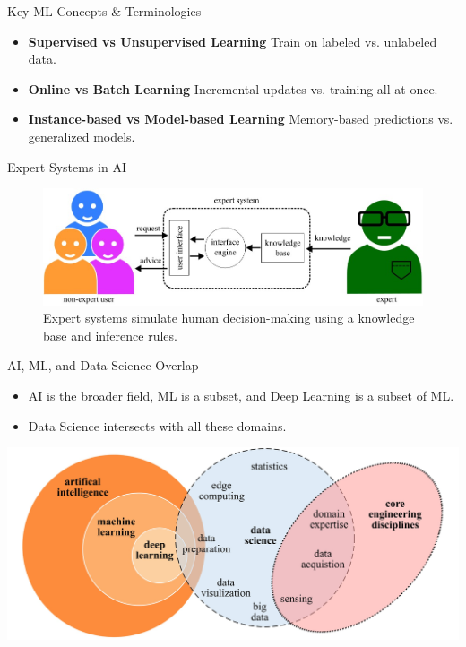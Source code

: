 \documentclass[aspectratio=169]{beamer}
\begin{document}
\begin{frame}{Key ML Concepts \& Terminologies}
\begin{itemize}
    \item \textbf{Supervised vs Unsupervised Learning}  
    Train on labeled vs. unlabeled data.
    \item \textbf{Online vs Batch Learning}  
    Incremental updates vs. training all at once.
    \item \textbf{Instance-based vs Model-based Learning}  
    Memory-based predictions vs. generalized models.
\end{itemize}
\end{frame}

\begin{frame}{Expert Systems in AI}
\begin{figure}
    \centering
    \includegraphics[width=0.9\linewidth]{../figures/expert_system}
    \caption{Expert systems simulate human decision-making using a knowledge base and inference rules.}
\end{figure}
\end{frame}

\begin{frame}{AI, ML, and Data Science Overlap}
\begin{itemize}
    \item AI is the broader field, ML is a subset, and Deep Learning is a subset of ML.
    \item Data Science intersects with all these domains.
\end{itemize}

\vspace{0.3cm}
\includegraphics[width=\linewidth]{../figures/AI-vs-ML-vs-Deep-Learning}
\end{frame}
\end{document}
